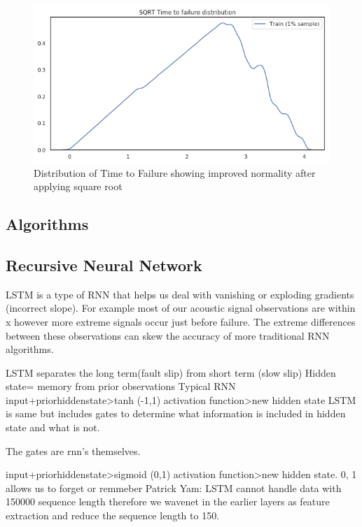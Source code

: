 \documentclass[]{llncs}
\begin{document}
\begin{figure}
	\centering
	\includegraphics[width=1\linewidth]{../GPUProject/transform2}
	\caption{Distribution of Time to Failure showing improved normality after applying square root}
	\label{fig:morethan90percent}
\end{figure}





\subsection{Algorithms}
\subsection{Recursive Neural Network}
LSTM is a type of RNN that helps us deal with vanishing or exploding gradients (incorrect slope). For example most of our acoustic signal observations are within x however more extreme signals occur just before failure. The extreme differences between these observations can skew the accuracy of more traditional RNN algorithms.

LSTM separates the long term(fault slip) from short term (slow slip)
Hidden state= memory from prior observations
Typical RNN input+priorhiddenstate>tanh (-1,1) activation function>new hidden state
LSTM is same but includes gates to determine what information is included in hidden state and what is not.

The gates are rnn's themselves.

input+priorhiddenstate>sigmoid (0,1) activation function>new hidden state. 0, 1 allows us to forget or remmeber 
Patrick Yam: LSTM cannot handle data with 150000 sequence length therefore we wavenet in the earlier layers as feature extraction and reduce the sequence length to 150.\par
\end{document}
